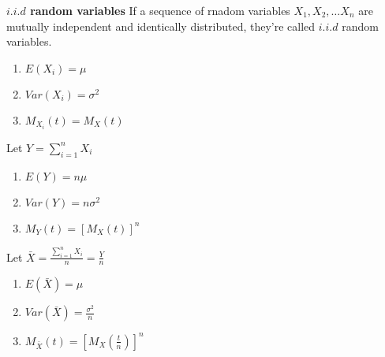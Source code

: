 \documentclass[12pt]{article}
\begin{document}
\textbf{$i.i.d$ random variables}
\newline
If a sequence of rnadom variables ${X_1,X_2,\ldots X_n}$ are mutually independent and identically distributed, they're called $i.i.d$ random variables.
\begin{enumerate}
    \item $E(X_i)=\mu$
    \item $Var(X_i)=\sigma^2$
    \item $M_{X_i}(t)=M_X(t)$
\end{enumerate}
Let $Y=\sum_{i=1}^n X_i$
\begin{enumerate}
    \item $E(Y)=n\mu$
    \item $Var(Y)=n\sigma^2$
    \item $M_Y(t)=[M_X(t)]^n$
\end{enumerate}
Let $\bar X=\frac{\sum_{i=1}^n X_i}{n}=\frac{Y}{n}$
\begin{enumerate}
    \item $E(\bar X)=\mu$
    \item $Var(\bar X)=\frac{\sigma^2}{n}$
    \item $M_{\bar X}(t)=[M_X(\frac{t}{n})]^n$
\end{enumerate}
\end{document}
